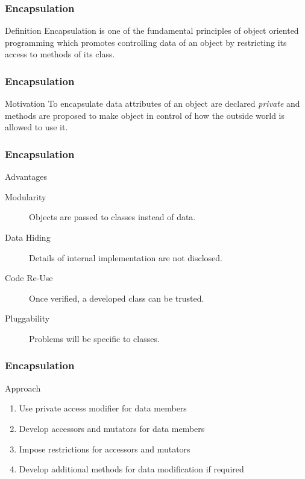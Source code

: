 \documentclass[10pt, compress]{beamer}
\begin{document}
\begin{frame}[fragile]
	\frametitle{Encapsulation}
	\begin{block}{Definition}
	Encapsulation is one of the fundamental principles of object oriented programming which promotes controlling data of an object by restricting its access to methods of its class.
	\end{block}
\end{frame}

\begin{frame}[fragile]
	\frametitle{Encapsulation}
	\begin{block}{Motivation}
	To encapsulate data attributes of an object are declared \textit{private} and methods are proposed to make object in control of how the outside world is allowed to use it.
	\end{block}
\end{frame}

\begin{frame}[fragile]
	\frametitle{Encapsulation}
	\begin{block}{Advantages}
	\begin{description}
	\item[Modularity] Objects are passed to classes instead of data.
	\item[Data Hiding] Details of internal implementation are not disclosed.
	\item[Code Re-Use] Once verified, a developed class can be trusted.
	\item[Pluggability] Problems will be specific to classes.
	\end{description}
	\end{block}
\end{frame}

\begin{frame}[fragile]
	\frametitle{Encapsulation}
	\begin{block}{Approach}
	\begin{enumerate}
	\item[] Use private access modifier for data members
	\item[] Develop accessors and mutators for data members
	\item[] Impose restrictions for accessors and mutators
	\item[] Develop additional methods for data modification if required
	\end{enumerate}
	\end{block}
\end{frame}
\end{document}
